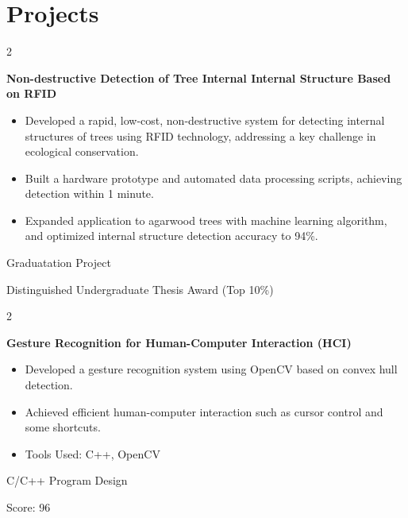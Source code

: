 \documentclass[10pt, letterpaper]{article}
\newenvironment{highlights}{
    \begin{itemize}[
        topsep=0.10 cm,
        parsep=0.10 cm,
        partopsep=0pt,
        itemsep=0pt,
        leftmargin=0.4 cm + 10pt
    ]
}{
    \end{itemize}
} %
\newenvironment{twocolentry}[2][]{
    \onecolentry
    \def\secondColumn{#2}
    \setcolumnwidth{\fill, 4.5 cm}
    \begin{paracol}{2}
}{
    \switchcolumn \raggedleft \secondColumn
    \end{paracol}
    \endonecolentry
} %
\let\hrefWithoutArrow\href
\renewcommand{\href}[2]{\hrefWithoutArrow{#1}{\ifthenelse{\equal{#2}{}}{ }{#2 }\raisebox{.15ex}{\footnotesize \faExternalLink*}}}
\begin{document}
    
    \section{Projects}



        
        \begin{twocolentry}{
            \small{Graduatation Project}
            
            Distinguished Undergraduate Thesis Award (Top 10\%)
        }
            \textbf{Non-destructive Detection of Tree Internal Internal Structure Based on RFID}
            \begin{highlights}
                \item \small{Developed a rapid, low-cost, non-destructive system for detecting internal structures of trees using RFID technology, addressing a key challenge in ecological conservation.}
                \item Built a hardware prototype and automated data processing scripts, achieving detection within 1 minute.
                \item Expanded application to agarwood trees with machine learning algorithm,  and optimized internal structure detection accuracy to 94\%.
            \end{highlights}
        \end{twocolentry}


        \vspace{0.15 cm}

        \begin{twocolentry}{
            \small{C/C++ Program Design}
            
            Score: 96 \href{https://github.com/Smangic/SUSTech_CS205_2022_HCI}{[Github]}
        }
            \textbf{Gesture Recognition for Human-Computer Interaction (HCI)}
            \begin{highlights}
                \item \small{Developed a gesture recognition system using OpenCV based on convex hull detection.}
                \item Achieved efficient human-computer interaction such as cursor control and some shortcuts.
                \item Tools Used: C++, OpenCV
            \end{highlights}
        \end{twocolentry}
\end{document}
